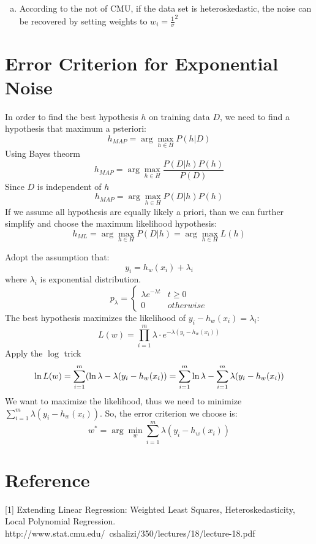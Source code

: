 \documentclass[a4paper, 12pt, titlepage]{article}
\begin{document}
\begin{enumerate}[(a)]
\begin{enumerate}[(a)]
        \item According to the not of CMU, if the data set is heteroskedastic, the noise can be recovered by setting weights to $w_i=\frac{1}\sigma^2$

\end{enumerate}
\section{Error Criterion for Exponential Noise}

In order to find the best hypothesis $h$ on training data $D$, we need to find a hypothesis that maximum a psteriori:
$$h_{MAP}=\arg\max_{h\in{}H}P(h|D)$$
Using Bayes theorm
$$h_{MAP}=\arg\max_{h\in{}H}\frac{P(D|h)P(h)}{P(D)}$$
Since $D$ is independent of $h$
$$h_{MAP}=\arg\max_{h\in{}H}P(D|h)P(h)$$
If we assume all hypothesis are equally likely a priori, than we can further simplify and choose the maximum likelihood hypothesis:
$$h_{ML}=\arg\max_{h\in{}H}P(D|h)=\arg\max_{h\in{}H}L(h)$$

Adopt the assumption that:
$$y_i=h_w(x_i)+\lambda_i$$
where $\lambda_i$ is exponential distribution.
$$
    p_\lambda=\begin{cases}
        \lambda{}e^{-\lambda{}t}&t\geq0 \\
        0&otherwise
    \end{cases}
$$
The best hypothesis maximizes the likelihood of $y_i-h_w(x_i)=\lambda_i$:
$$L(w)=\prod_{i=1}^m\lambda\cdot{}e^{-\lambda(y_i-h_w(x_i))}$$
Apply the $\log$ trick
$$\ln{}L(w)=\sum^m_{i=1}(\ln\lambda-\lambda(y_i-h_w(x_i))\\
=\sum^m_{i=1}\ln\lambda-\sum^m_{i=1}\lambda(y_i-h_w(x_i))$$
We want to maximize the likelihood, thus we need to minimize $\sum^m_{i=1}\lambda(y_i-h_w(x_i))$. So, the error criterion we choose is:
$$w^*=\arg\min_w\sum^m_{i=1}\lambda(y_i-h_w(x_i))$$


\end{enumerate}
\section{Reference}
[1] Extending Linear Regression: Weighted Least Squares, Heteroskedasticity, Local Polynomial Regression. http://www.stat.cmu.edu/~cshalizi/350/lectures/18/lecture-18.pdf
\end{document}
